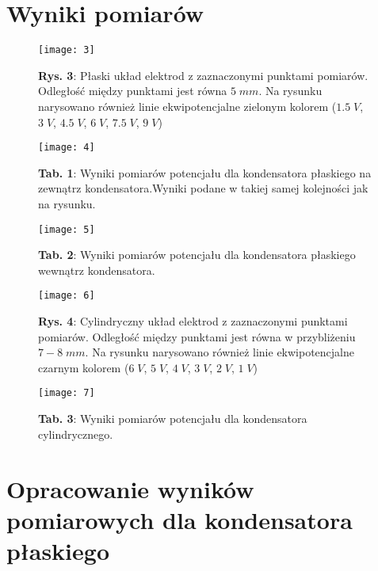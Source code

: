 \documentclass[12pt]{article}
\begin{document}
\section{Wyniki pomiarów}
\begin{figure}[H]
\centering
\texttt{[image: 3]}
\caption*{\textbf{Rys. 3}: Płaski układ elektrod z zaznaczonymi punktami pomiarów. Odległość między punktami jest równa $5\;mm$.
 Na rysunku narysowano również linie ekwipotencjalne zielonym kolorem \newline ($1.5\;V$, $3\;V$, $4.5\;V$, $6\;V$, $7.5\;V$, $9\;V$)}
\end{figure} 
\begin{figure}[H]
\centering
\texttt{[image: 4]}
\caption*{\textbf{Tab. 1}: Wyniki pomiarów potencjału dla kondensatora płaskiego na zewnątrz kondensatora.\newline Wyniki podane w takiej samej kolejności jak na rysunku.}
\end{figure} 
\begin{figure}[H]
\centering
\texttt{[image: 5]}
\caption*{\noindent\textbf{Tab. 2}: Wyniki pomiarów potencjału dla kondensatora płaskiego wewnątrz kondensatora. }
\end{figure} \newpage
\begin{figure}[H]
\centering
\texttt{[image: 6]}
\caption*{\textbf{Rys. 4}: Cylindryczny układ elektrod z zaznaczonymi punktami pomiarów. Odległość między punktami jest równa w przybliżeniu
$7-8\;mm$. Na rysunku narysowano również linie ekwipotencjalne czarnym kolorem ($6\;V$, $5\;V$, $4\;V$, $3\;V$, $2\;V$, $1\;V$) }
\end{figure} 
\begin{figure}[H]
\centering
\texttt{[image: 7]}
\caption*{\textbf{Tab. 3}: Wyniki pomiarów potencjału dla kondensatora cylindrycznego.}
\end{figure} \newpage
\section{Opracowanie wyników pomiarowych dla kondensatora płaskiego}
\end{document}
